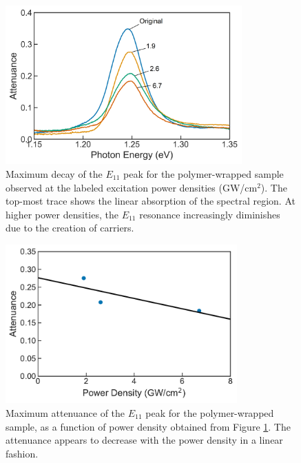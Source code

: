 \begin{figure}[ht]
	\centering
	\includegraphics[height=2.4in]{images/chapter_my_data/Jan_CNT_max_abs_change_relabeled}
	\caption{Maximum decay of the $E_{11}$ peak for the polymer-wrapped sample observed at the labeled excitation power densities (GW/cm$^2$). The top-most trace shows the linear absorption of the spectral region. At higher power densities, the $E_{11}$ resonance increasingly diminishes due to the creation of carriers.}
	\label{fig:jan_cnt_max_decay}
\end{figure}

\begin{figure}[H]
	\centering
	\includegraphics[height=2.4in]{images/chapter_my_data/Jan_CNT_max_attenuance_and_fit}
	\caption{Maximum attenuance of the $E_{11}$ peak for the polymer-wrapped sample, as a function of power density obtained from Figure \ref{fig:jan_cnt_max_decay}. The attenuance appears to decrease with the power density in a linear fashion.}
	\label{fig:jan_cnt_max_decay_fit}
\end{figure}

